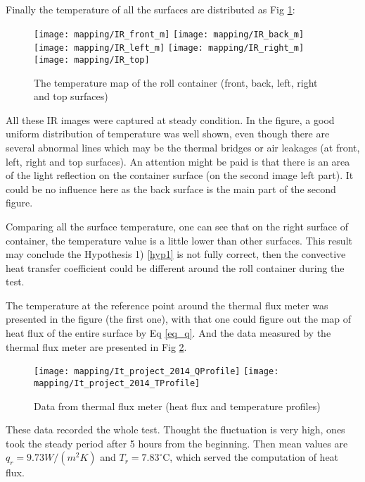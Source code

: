 Finally the temperature of all the surfaces are distributed as Fig \ref{IR_box}:
\begin{figure}[!htbp]
	\centering
	\texttt{[image: mapping/IR\_front\_m]}
	\hspace{6pt}
	\texttt{[image: mapping/IR\_back\_m]}
	\vspace{3pt}
	\texttt{[image: mapping/IR\_left\_m]}
	\hspace{6pt}
	\texttt{[image: mapping/IR\_right\_m]}
	\texttt{[image: mapping/IR\_top]}
	\caption{The temperature map of the roll container (front, back, left, right and top surfaces)}
	\label{IR_box}
\end{figure}
All these IR images were captured at steady condition. 
In the figure, a good uniform distribution of temperature was well shown, even though there are several abnormal lines which may be the thermal bridges or air leakages (at front, left, right and top surfaces). An attention might be paid is that there is an area of the light reflection on the container surface (on the second image left part). It could be no influence here as the back surface is the main part of the second figure.

Comparing all the surface temperature, one can see that on the right surface of container, the temperature value is a little lower than other surfaces. This result may conclude the Hypothesis 1) \ref{hyp1} is not fully correct, then the convective heat transfer coefficient could be different around the roll container during the test.

The temperature at the reference point around the thermal flux meter was presented in the figure (the first one), with that one could figure out the map of heat flux of the entire surface by Eq \ref{eq_q}. And the data measured by the thermal flux meter are presented in Fig \ref{flux_meter}.
\begin{figure}[!htbp]
	\centering
	\texttt{[image: mapping/It\_project\_2014\_QProfile]}
	\texttt{[image: mapping/It\_project\_2014\_TProfile]}
	\caption{Data from thermal flux meter (heat flux and temperature profiles)}
	\label{flux_meter}
\end{figure}
These data recorded the whole test. Thought the fluctuation is very high, ones took the steady period after 5 hours from the beginning. Then mean values are $q_r=9.73 W/(m^2 K)$ and $T_r = 7.83 ^\circ$C, which served the computation of heat flux.

